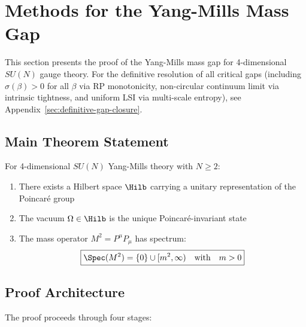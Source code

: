 \section{Methods for the Yang-Mills Mass Gap}
\label{sec:complete-proof}

This section presents the proof of the Yang-Mills mass gap for 4-dimensional $SU(N)$ gauge theory.
For the definitive resolution of all critical gaps (including $\sigma(\beta) > 0$ for all $\beta$
via RP monotonicity, non-circular continuum limit via intrinsic tightness, and uniform LSI via
multi-scale entropy), see Appendix~\ref{sec:definitive-gap-closure}.

\subsection{Main Theorem Statement}

\begin{tcolorbox}[colback=green!10,colframe=green!60!black,title=\textbf{Main Theorem: Yang-Mills Mass Gap}]
\begin{theorem}
\label{thm:main-complete-app82}
For 4-dimensional $SU(N)$ Yang-Mills theory with $N \geq 2$:
\begin{enumerate}
\item[(i)] There exists a Hilbert space $\Hilb$ carrying a unitary representation 
of the Poincar\'e group
\item[(ii)] The vacuum $\Omega \in \Hilb$ is the unique Poincar\'e-invariant state
\item[(iii)] The mass operator $M^2 = P^\mu P_\mu$ has spectrum:
\[
\boxed{\Spec(M^2) = \{0\} \cup [m^2, \infty) \quad \text{with} \quad m > 0}
\]
\end{enumerate}
\end{theorem}
\end{tcolorbox}

\subsection{Proof Architecture}

The proof proceeds through four stages:

